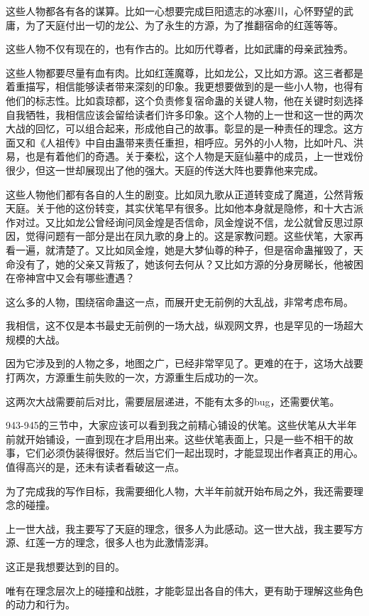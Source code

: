 \begin{this_body}
这些人物都各有各的谋算。比如一心想要完成巨阳遗志的冰塞川，心怀野望的武庸，为了天庭付出一切的龙公、为了永生的方源，为了推翻宿命的红莲等等。

这些人物不仅有现在的，也有作古的。比如历代尊者，比如武庸的母亲武独秀。

这些人物都要尽量有血有肉。比如红莲魔尊，比如龙公，又比如方源。这三者都是着重描写，相信能够读者带来深刻的印象。我更想要做到的是一些小人物，也得有他们的标志性。比如袁琼都，这个负责修复宿命蛊的关键人物，他在关键时刻选择自我牺牲，我相信应该会留给读者们许多印象。这个人物的上一世和这一世的两次大战的回忆，可以组合起来，形成他自己的故事。彰显的是一种责任的理念。这方面又和《人祖传》中自由蛊带来责任重担，相呼应。另外的小人物，比如叶凡、洪易，也是有着他们的奇遇。关于秦松，这个人物是天庭仙墓中的成员，上一世戏份很少，但这一世却展现出了他的强大。天庭的传送大阵也要靠他来完成。

这些人物他们都有各自的人生的剧变。比如凤九歌从正道转变成了魔道，公然背叛天庭。关于他的这份转变，其实伏笔早有很多。比如他本身就是隐修，和十大古派作对过。又比如龙公曾经询问凤金煌是否信命，凤金煌说不信，龙公就曾反思过原因，觉得问题有一部分是出在凤九歌的身上的。这是家教问题。这些伏笔，大家再看一遍，就清楚了。又比如凤金煌，她是大梦仙尊的种子，但是宿命蛊摧毁了，天命没有了，她的父亲又背叛了，她该何去何从？又比如方源的分身房睇长，他被困在帝神宫中又会有哪些遭遇？

这么多的人物，围绕宿命蛊这一点，而展开史无前例的大乱战，非常考虑布局。

我相信，这不仅是本书最史无前例的一场大战，纵观网文界，也是罕见的一场超大规模的大战。

因为它涉及到的人物之多，地图之广，已经非常罕见了。更难的在于，这场大战要打两次，方源重生前失败的一次，方源重生后成功的一次。

这两次大战需要前后对比，需要层层递进，不能有太多的bug，还需要伏笔。

943-945的三节中，大家应该可以看到我之前精心铺设的伏笔。这些伏笔从大半年前就开始铺设，一直到现在才启用出来。这些伏笔表面上，只是一些不相干的故事，它们必须伪装得很好。然后当它们一起出现时，才能显现出作者真正的用心。值得高兴的是，还未有读者看破这一点。

为了完成我的写作目标，我需要细化人物，大半年前就开始布局之外，我还需要理念的碰撞。

上一世大战，我主要写了天庭的理念，很多人为此感动。这一世大战，我主要写方源、红莲一方的理念，很多人也为此激情澎湃。

这正是我想要达到的目的。

唯有在理念层次上的碰撞和战胜，才能彰显出各自的伟大，更有助于理解这些角色的动力和行为。


\end{this_body}

